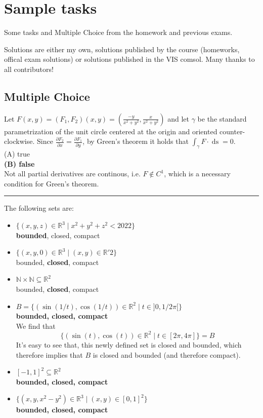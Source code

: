 \documentclass[a4paper,fontsize = 10pt]{article}
\def\R{\mathbb{R}}
\def\N{\mathbb{N}}
\begin{document}
\endgroup

\section{Sample tasks}
Some tasks and Multiple Choice from the homework and previous exams. 

Solutions are either my own, solutions published by the course (homeworks, offical exam solutions) or solutions published in the VIS comsol. Many thanks to all contributors!
\subsection{Multiple Choice}
Let \(F(x,y) = (F_1, F_2)(x,y) = (\frac{-y}{x^2 + y^2}, \frac{x}{x^2 + y^2})\) and let $\gamma$ be the standard parametrization of the unit circle centered at the origin and oriented counter-clockwise. Since \(\frac{\partial F_2}{\partial x} = \frac{\partial F_1}{\partial y}\), by Green's theorem it holds that \(\int_\gamma F \cdot \mathop{ds} = 0\).
\\(A) true
\\\textbf{(B) false}
\\Not all partial derivatives are continous, i.e. $F \notin C^1$, which is a necessary condition for Green's theorem.

\vspace{0.1 cm}
\hrule
\vspace{0.2 cm}

The following sets are:
\begin{itemize}
  \item \(\{(x,y,z) \in \R^3 \mid x^2 + y^2 + z^2 < 2022\}\)
  \\ \textbf{bounded}, closed, compact
  \item \(\{(x,y,0) \in \R^3 \mid (x,y) \in \R'2\}\)
  \\ bounded, \textbf{closed}, compact
  \item \(\N \times \N \subseteq \R^2\)
  \\ bounded, \textbf{closed}, compact
  \item \(B = \{(\sin(1/t),\cos(1/t)) \in \R^2 \mid t \in ]0, 1/2\pi[\}\)
  \\ \textbf{bounded, closed, compact}
  \\ We find that \[\{(\sin(t), \cos(t)) \in \R^2 \mid t \in [2\pi, 4 \pi]\} = B\]
  It's easy to see that, this newly defined set is closed and bounded, which therefore implies that $B$ is closed and bounded (and therefore compact).
  \item \([-1,1]^2 \subseteq \R^2\)
  \\\textbf{bounded, closed, compact}
  \item \(\{(x,y,x^2-y^2) \in \R^3 \mid (x,y) \in [0,1]^2\}\)
  \\ \textbf{bounded, closed, compact}
\end{itemize}
\end{document}
